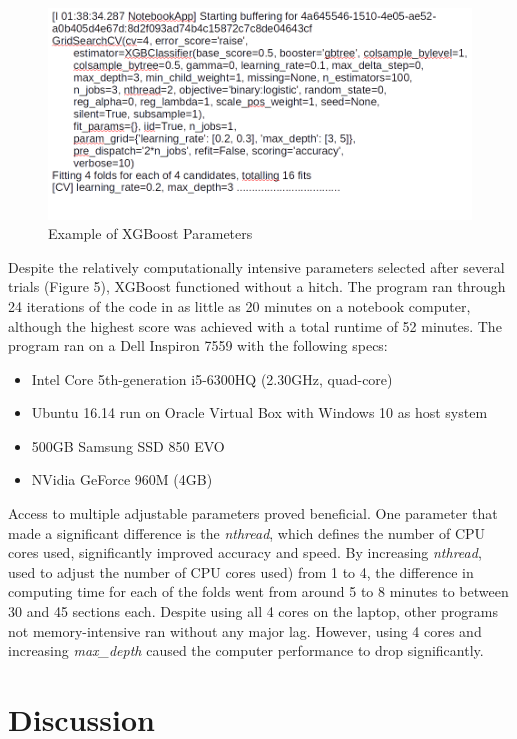 \begin{figure}[H]
\centering
\includegraphics[width=\columnwidth]{images/xgb_params.png}
\caption{Example of XGBoost Parameters}
\label{fig:xgb_params}
\end{figure} 

Despite the relatively computationally intensive parameters selected
after several trials (Figure 5), XGBoost functioned without a hitch.
The program ran through 24 iterations of the code in as little as 20
minutes on a notebook computer, although the highest score was
achieved with a total runtime of 52 minutes.  The program ran on a
Dell Inspiron 7559 with the following specs:

\begin{itemize}
\item Intel Core 5th-generation i5-6300HQ (2.30GHz, quad-core)
\item Ubuntu 16.14 run on Oracle Virtual Box with Windows 10 as host
  system
\item 500GB Samsung SSD 850 EVO
\item NVidia GeForce 960M (4GB)
\end{itemize}

Access to multiple adjustable parameters proved beneficial.  One
parameter that made a significant difference is the \emph{nthread},
which defines the number of CPU cores used, significantly improved
accuracy and speed.  By increasing \emph{nthread}, used to adjust the
number of CPU cores used) from 1 to 4, the difference in computing
time for each of the folds went from around 5 to 8 minutes to between
30 and 45 sections each.  Despite using all 4 cores on the laptop,
other programs not memory-intensive ran without any major lag.
However, using 4 cores and increasing \emph{max\_depth} caused the
computer performance to drop significantly.

\section{Discussion}

